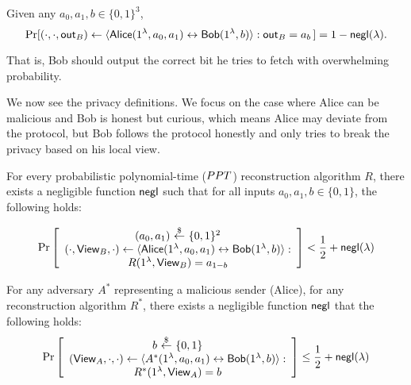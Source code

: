 \begin{definition}[Correctness of OT]
    Given any $a_0, a_1, b\in \{0,1\}^3$, 
    $$\Pr[(\cdot,\cdot,{\sf out}_B) \leftarrow \langle\textsf{Alice}(1^\lambda, a_0, a_1) \leftrightarrow \textsf{Bob}(1^\lambda, b) \rangle: {\sf out}_B = a_b \,] = 1 - {\sf negl}(\lambda).$$
\end{definition}

That is, Bob should output the correct bit he tries to fetch with overwhelming probability.

We now see the privacy definitions. We focus on the case where Alice can be malicious and Bob is honest but curious, which means Alice may deviate from the protocol, but Bob follows the protocol honestly and only tries to break the privacy based on his local view.


\begin{definition}


For every probabilistic polynomial-time ($PPT$) reconstruction algorithm $R$, there exists a negligible function ${\sf negl}$ such that for all inputs $a_0,a_1,b\in\{0,1\}$, the following holds:

\[
\Pr \left[
\begin{array}{c}
(a_0,a_1)~{\overset{\$}{\leftarrow}}~ \{0,1\}^2\\
(\cdot,{\sf View}_B,\cdot) \leftarrow \langle {\sf Alice}(1^\lambda, a_0, a_1) \leftrightarrow {\sf Bob}(1^\lambda, b)\rangle : \\
R(1^\lambda, {\sf View}_B) = a_{1-b}
\end{array}
\right] < \frac{1}{2} + {\sf negl}(\lambda)
\]

\end{definition}

\begin{definition}
    

For any \PPT adversary $A^*$ representing a malicious sender (Alice), 
for any \PPT reconstruction algorithm $R^*$, 
there exists a negligible function ${\sf negl}$ that 
the following holds:
\[
\Pr \left[
\begin{array}{c}
b ~{\overset{\$}{\leftarrow}}~ \{0,1\} \\
({\sf View}_A, \cdot, \cdot)\leftarrow \langle A^*(1^\lambda, a_0, a_1) \leftrightarrow {\sf Bob}(1^\lambda, b)\rangle : \\
R^*(1^\lambda,{\sf View}_A) = b
\end{array}
\right] \leq \frac{1}{2} + {\sf negl}(\lambda)
\]
\end{definition}

